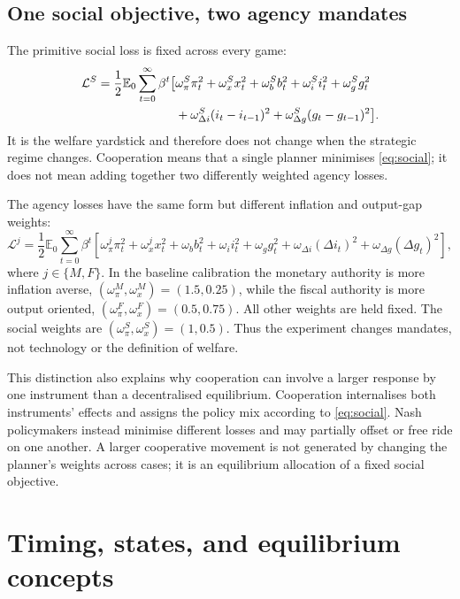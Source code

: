 \documentclass[11pt]{article}
\newcommand{\E}{\mathbb{E}}
\newcommand{\loss}{\mathcal{L}}
\begin{document}
\subsection{One social objective, two agency mandates}

The primitive social loss is fixed across every game:
\begin{align}
 \loss^S = \frac12\E_0\sum_{t=0}^{\infty}\beta^t\bigl[
 &\omega_\pi^S\pi_t^2+\omega_x^Sx_t^2+\omega_b^Sb_t^2
 +\omega_i^Si_t^2+\omega_g^Sg_t^2 \notag\\
 &+\omega_{\Delta i}^S(i_t-i_{t-1})^2
 +\omega_{\Delta g}^S(g_t-g_{t-1})^2\bigr].                 \label{eq:social}
\end{align}
It is the welfare yardstick and therefore does not change when the strategic
regime changes.  Cooperation means that a single planner minimises
\eqref{eq:social}; it does not mean adding together two differently weighted
agency losses.

The agency losses have the same form but different inflation and output-gap
weights:
\begin{equation}
 \loss^j=\frac12\E_0\sum_{t=0}^{\infty}\beta^t
 \left[\omega_\pi^j\pi_t^2+\omega_x^jx_t^2+
 \omega_b b_t^2+\omega_i i_t^2+\omega_g g_t^2+
 \omega_{\Delta i}(\Delta i_t)^2+
 \omega_{\Delta g}(\Delta g_t)^2\right],                    \label{eq:agency}
\end{equation}
where $j\in\{M,F\}$.  In the baseline calibration the monetary authority is
more inflation averse, $(\omega_\pi^M,\omega_x^M)=(1.5,0.25)$, while the fiscal
authority is more output oriented,
$(\omega_\pi^F,\omega_x^F)=(0.5,0.75)$.  All other weights are held fixed.
The social weights are $(\omega_\pi^S,\omega_x^S)=(1,0.5)$.  Thus the
experiment changes mandates, not technology or the definition of welfare.

This distinction also explains why cooperation can involve a larger response
by one instrument than a decentralised equilibrium.  Cooperation internalises
both instruments' effects and assigns the policy mix according to
\eqref{eq:social}.  Nash policymakers instead minimise different losses and may
partially offset or free ride on one another.  A larger cooperative movement is
not generated by changing the planner's weights across cases; it is an
equilibrium allocation of a fixed social objective.

\section{Timing, states, and equilibrium concepts}
\end{document}

